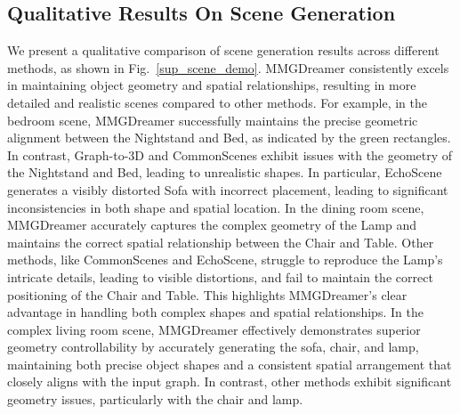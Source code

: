 \subsection{Qualitative Results On Scene Generation}
We present a qualitative comparison of scene generation results across different methods, as shown in Fig.~\ref{sup_scene_demo}.
MMGDreamer consistently excels in maintaining object geometry and spatial relationships, resulting in more detailed and realistic scenes compared to other methods.
For example, in the bedroom scene, MMGDreamer successfully maintains the precise geometric alignment between the Nightstand and Bed, as indicated by the green rectangles. 
In contrast, Graph-to-3D and CommonScenes exhibit issues with the geometry of the Nightstand and Bed, leading to unrealistic shapes. In particular, EchoScene generates a visibly distorted Sofa with incorrect placement, leading to significant inconsistencies in both shape and spatial location.
In the dining room scene, MMGDreamer accurately captures the complex geometry of the Lamp and maintains the correct spatial relationship between the Chair and Table. Other methods, like CommonScenes and EchoScene, struggle to reproduce the Lamp's intricate details, leading to visible distortions, and fail to maintain the correct positioning of the Chair and Table. This highlights MMGDreamer's clear advantage in handling both complex shapes and spatial relationships.
In the complex living room scene, MMGDreamer effectively demonstrates superior geometry controllability by accurately generating the sofa, chair, and lamp, maintaining both precise object shapes and a consistent spatial arrangement that closely aligns with the input graph. In contrast, other methods exhibit significant geometry issues, particularly with the chair and lamp.
